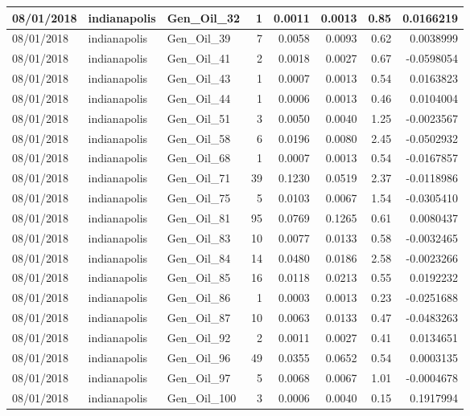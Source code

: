\documentclass[
  letterpaper,
  DIV=11,
  numbers=noendperiod]{scrartcl}
\begin{document}
\begin{tabular}{l|l|l|r|r|r|r|r}
\hline
08/01/2018 & indianapolis & Gen\_Oil\_32 & 1 & 0.0011 & 0.0013 & 0.85 & 0.0166219\\
\hline
08/01/2018 & indianapolis & Gen\_Oil\_39 & 7 & 0.0058 & 0.0093 & 0.62 & 0.0038999\\
\hline
08/01/2018 & indianapolis & Gen\_Oil\_41 & 2 & 0.0018 & 0.0027 & 0.67 & -0.0598054\\
\hline
08/01/2018 & indianapolis & Gen\_Oil\_43 & 1 & 0.0007 & 0.0013 & 0.54 & 0.0163823\\
\hline
08/01/2018 & indianapolis & Gen\_Oil\_44 & 1 & 0.0006 & 0.0013 & 0.46 & 0.0104004\\
\hline
08/01/2018 & indianapolis & Gen\_Oil\_51 & 3 & 0.0050 & 0.0040 & 1.25 & -0.0023567\\
\hline
08/01/2018 & indianapolis & Gen\_Oil\_58 & 6 & 0.0196 & 0.0080 & 2.45 & -0.0502932\\
\hline
08/01/2018 & indianapolis & Gen\_Oil\_68 & 1 & 0.0007 & 0.0013 & 0.54 & -0.0167857\\
\hline
08/01/2018 & indianapolis & Gen\_Oil\_71 & 39 & 0.1230 & 0.0519 & 2.37 & -0.0118986\\
\hline
08/01/2018 & indianapolis & Gen\_Oil\_75 & 5 & 0.0103 & 0.0067 & 1.54 & -0.0305410\\
\hline
08/01/2018 & indianapolis & Gen\_Oil\_81 & 95 & 0.0769 & 0.1265 & 0.61 & 0.0080437\\
\hline
08/01/2018 & indianapolis & Gen\_Oil\_83 & 10 & 0.0077 & 0.0133 & 0.58 & -0.0032465\\
\hline
08/01/2018 & indianapolis & Gen\_Oil\_84 & 14 & 0.0480 & 0.0186 & 2.58 & -0.0023266\\
\hline
08/01/2018 & indianapolis & Gen\_Oil\_85 & 16 & 0.0118 & 0.0213 & 0.55 & 0.0192232\\
\hline
08/01/2018 & indianapolis & Gen\_Oil\_86 & 1 & 0.0003 & 0.0013 & 0.23 & -0.0251688\\
\hline
08/01/2018 & indianapolis & Gen\_Oil\_87 & 10 & 0.0063 & 0.0133 & 0.47 & -0.0483263\\
\hline
08/01/2018 & indianapolis & Gen\_Oil\_92 & 2 & 0.0011 & 0.0027 & 0.41 & 0.0134651\\
\hline
08/01/2018 & indianapolis & Gen\_Oil\_96 & 49 & 0.0355 & 0.0652 & 0.54 & 0.0003135\\
\hline
08/01/2018 & indianapolis & Gen\_Oil\_97 & 5 & 0.0068 & 0.0067 & 1.01 & -0.0004678\\
\hline
08/01/2018 & indianapolis & Gen\_Oil\_100 & 3 & 0.0006 & 0.0040 & 0.15 & 0.1917994\\

\end{tabular}
\end{document}
